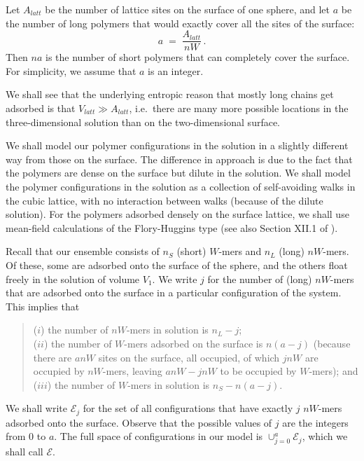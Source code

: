 \documentclass[journal=mamobx,manuscript=article]{achemso}
\begin{document}
Let $A_{latt}$ be the number of lattice sites on the surface of one sphere, and let $a$
be the number of long polymers that would exactly cover all the sites of the surface:
\[    a  \;=\;  \frac{A_{latt}}{nW}   \,  .  \]
Then $na$ is the number of short polymers that can completely cover the surface.
For simplicity, we assume that $a$ is an integer.

We shall see that the underlying entropic reason that
mostly long chains get adsorbed is that $V_{latt}\gg A_{latt}$, i.e.\ there are many more possible locations in 
the three-dimensional solution than on the two-dimensional surface.


We shall model our polymer configurations in the solution in a slightly different way from those on the surface.
The difference in approach is due to the fact that the polymers are dense on the surface but 
dilute in the solution.  We shall model the polymer configurations in the solution as a collection of 
self-avoiding walks in the cubic lattice, with no interaction between walks (because of the dilute solution).
For the polymers adsorbed densely on the surface lattice, we shall use mean-field calculations 
of the Flory-Huggins type 
(see also Section XII.1 of \cite{Flory1953}).

Recall that our ensemble consists of $n_S$ (short) $W$-mers and $n_L$ (long) $nW$-mers.
Of these, some are adsorbed onto the surface of the sphere, and the others float freely in the 
solution of volume $V_1$.  We write $j$ for the number of (long) $nW$-mers that are adsorbed 
onto the surface in a particular configuration of the system.  This implies that
\begin{verse}
 ($i$) the number of $nW$-mers in solution is $n_L-j$;
 \\
 ($ii$) the number of $W$-mers adsorbed on the surface is $n(a-j)$ (because there are $anW$ sites on the
 surface, all occupied, of which $jnW$ are occupied by $nW$-mers, leaving $anW-jnW$ to be 
 occupied by $W$-mers); and
 \\
 ($iii$) the number of $W$-mers in solution is $n_S-n(a-j)$.
 \end{verse}  
We shall write $\mathcal{E}_j$ for the set of all configurations that have exactly $j$ $nW$-mers adsorbed 
onto the surface.  Observe that the possible values of $j$ are the integers from 0 to $a$.
The full space of configurations in our model is $\cup_{j=0}^a {\mathcal{E}_j}$, 
which we shall call $\mathcal{E}$.
\end{document}
